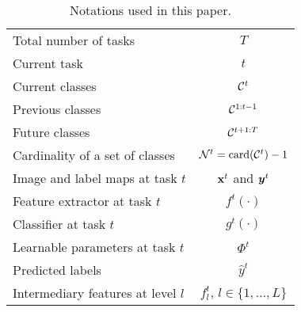 \begin{table}[t]
    \centering
    \begin{tabular}{@{}l|c@{}}
        \toprule
        Total number of tasks              & $T$                                      \\
        Current task                       & $t$                                      \\
        Current classes                    & $\mathcal{C}^t$                                 \\
        Previous classes                   & $\mathcal{C}^{1:t-1}$                           \\
        Future classes                     & $\mathcal{C}^{t+1:T}$                           \\
        Cardinality of a set of classes    & $\mathcal{N}^t=\operatorname{card}(\mathcal{C}^{t})-1$ \\
        Image and label maps at task $t$   & $\mathbf{x}^t$ and ${\bm{y}}^t$                       \\
        Feature extractor at task $t$      & $f^t(\cdot)$                             \\
        Classifier at task $t$             & $g^t(\cdot)$                             \\
        Learnable parameters at task $t$   & $\Phi^t$                                 \\
        Predicted labels                   & $\hat{y}^t$                              \\
        Intermediary features at level $l$ & $f^t_l,\,l \in \{1, \dots, L\}$          \\
        \bottomrule
    \end{tabular}
    \caption{Notations used in this paper.}
    \label{tab:related_notation}
\end{table}
